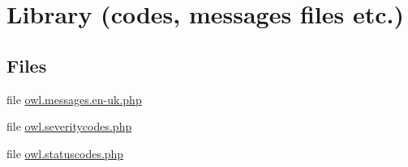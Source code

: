 \hypertarget{group__OWL__LIBRARY}{
\section{Library (codes, messages files etc.)}
\label{group__OWL__LIBRARY}
}
\subsection*{Files}
\begin{CompactItemize}
\item 
file \hyperlink{owl_8messages_8en-uk_8php}{owl.messages.en-uk.php}
\item 
file \hyperlink{owl_8severitycodes_8php}{owl.severitycodes.php}
\item 
file \hyperlink{owl_8statuscodes_8php}{owl.statuscodes.php}
\end{CompactItemize}

